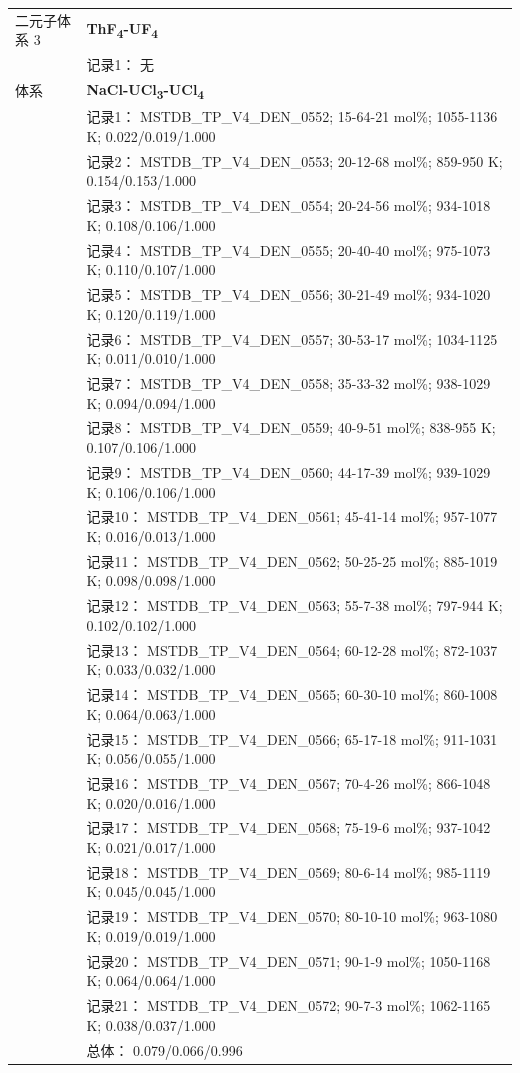 \documentclass[12pt]{article}
\begin{document}
{\begin{longtable}[]{@{}
  >{\raggedright\arraybackslash}p{}
  >{\raggedright\arraybackslash}p{}@{}}
二元子体系 3 & \textbf{ThF\textsubscript{4}-UF\textsubscript{4}} \\
 & 记录1： 无 \\
\midrule
体系 & \textbf{NaCl-UCl\textsubscript{3}-UCl\textsubscript{4}} \\
 & 记录1： MSTDB\_TP\_V4\_DEN\_0552; 15-64-21 mol\%; 1055-1136 K; 0.022/0.019/1.000 \\
 & 记录2： MSTDB\_TP\_V4\_DEN\_0553; 20-12-68 mol\%; 859-950 K; 0.154/0.153/1.000 \\
 & 记录3： MSTDB\_TP\_V4\_DEN\_0554; 20-24-56 mol\%; 934-1018 K; 0.108/0.106/1.000 \\
 & 记录4： MSTDB\_TP\_V4\_DEN\_0555; 20-40-40 mol\%; 975-1073 K; 0.110/0.107/1.000 \\
 & 记录5： MSTDB\_TP\_V4\_DEN\_0556; 30-21-49 mol\%; 934-1020 K; 0.120/0.119/1.000 \\
 & 记录6： MSTDB\_TP\_V4\_DEN\_0557; 30-53-17 mol\%; 1034-1125 K; 0.011/0.010/1.000 \\
 & 记录7： MSTDB\_TP\_V4\_DEN\_0558; 35-33-32 mol\%; 938-1029 K; 0.094/0.094/1.000 \\
 & 记录8： MSTDB\_TP\_V4\_DEN\_0559; 40-9-51 mol\%; 838-955 K; 0.107/0.106/1.000 \\
 & 记录9： MSTDB\_TP\_V4\_DEN\_0560; 44-17-39 mol\%; 939-1029 K; 0.106/0.106/1.000 \\
 & 记录10： MSTDB\_TP\_V4\_DEN\_0561; 45-41-14 mol\%; 957-1077 K; 0.016/0.013/1.000 \\
 & 记录11： MSTDB\_TP\_V4\_DEN\_0562; 50-25-25 mol\%; 885-1019 K; 0.098/0.098/1.000 \\
 & 记录12： MSTDB\_TP\_V4\_DEN\_0563; 55-7-38 mol\%; 797-944 K; 0.102/0.102/1.000 \\
 & 记录13： MSTDB\_TP\_V4\_DEN\_0564; 60-12-28 mol\%; 872-1037 K; 0.033/0.032/1.000 \\
 & 记录14： MSTDB\_TP\_V4\_DEN\_0565; 60-30-10 mol\%; 860-1008 K; 0.064/0.063/1.000 \\
 & 记录15： MSTDB\_TP\_V4\_DEN\_0566; 65-17-18 mol\%; 911-1031 K; 0.056/0.055/1.000 \\
 & 记录16： MSTDB\_TP\_V4\_DEN\_0567; 70-4-26 mol\%; 866-1048 K; 0.020/0.016/1.000 \\
 & 记录17： MSTDB\_TP\_V4\_DEN\_0568; 75-19-6 mol\%; 937-1042 K; 0.021/0.017/1.000 \\
 & 记录18： MSTDB\_TP\_V4\_DEN\_0569; 80-6-14 mol\%; 985-1119 K; 0.045/0.045/1.000 \\
 & 记录19： MSTDB\_TP\_V4\_DEN\_0570; 80-10-10 mol\%; 963-1080 K; 0.019/0.019/1.000 \\
 & 记录20： MSTDB\_TP\_V4\_DEN\_0571; 90-1-9 mol\%; 1050-1168 K; 0.064/0.064/1.000 \\
 & 记录21： MSTDB\_TP\_V4\_DEN\_0572; 90-7-3 mol\%; 1062-1165 K; 0.038/0.037/1.000 \\
 & 总体： 0.079/0.066/0.996  \\


\end{longtable}}
\end{document}
